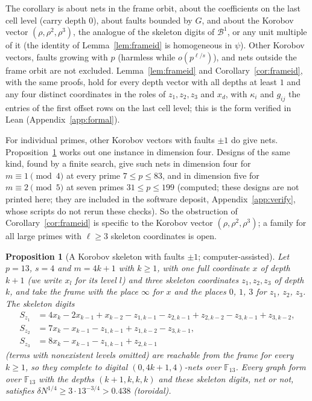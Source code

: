 \documentclass[11pt]{amsart}
\newtheorem{proposition}[theorem]{Proposition}
\theoremstyle{definition}
\theoremstyle{plain}
\newcommand{\F}{\mathbb{F}}
\begin{document}
The corollary is about nets in the frame orbit, about the coefficients on the last cell level (carry depth $0$), about faults bounded by $G$, and about the Korobov vector $(\rho,\rho^2,\rho^3)$, the analogue of the skeleton digits of $\mathcal B^1$, or any unit multiple of it (the identity of Lemma~\ref{lem:frameid} is homogeneous in $\psi$). Other Korobov vectors, faults growing with $p$ (harmless while $o(p^{\ell/s})$), and nets outside the frame orbit are not excluded. Lemma~\ref{lem:frameid} and Corollary~\ref{cor:frameid}, with the same proofs, hold for every depth vector with all depths at least $1$ and any four distinct coordinates in the roles of $z_1,z_2,z_3$ and $x_d$, with $\kappa_i$ and $g_{ij}$ the entries of the first offset rows on the last cell level; this is the form verified in Lean (Appendix~\ref{app:formal}).

For individual primes, other Korobov vectors with faults $\pm1$ do give nets. Proposition~\ref{prop:korobov4} works out one instance in dimension four. Designs of the same kind, found by a finite search, give such nets in dimension four for $m\equiv1\pmod4$ at every prime $7\le p\le83$, and in dimension five for $m\equiv2\pmod5$ at seven primes $31\le p\le199$ (computed; these designs are not printed here; they are included in the software deposit, Appendix~\ref{app:verify}, whose scripts do not rerun these checks). So the obstruction of Corollary~\ref{cor:frameid} is specific to the Korobov vector $(\rho,\rho^2,\rho^3)$; a family for all large primes with $\ell\ge3$ skeleton coordinates is open.

\begin{proposition}[A Korobov skeleton with faults $\pm1$; computer-assisted]\label{prop:korobov4}
Let $p=13$, $s=4$ and $m=4k+1$ with $k\ge1$, with one full coordinate $x$ of depth $k+1$ (we write $x_l$ for its level $l$) and three skeleton coordinates $z_1,z_2,z_3$ of depth $k$, and take the frame with the place $\infty$ for $x$ and the places $0$, $1$, $3$ for $z_1$, $z_2$, $z_3$. The skeleton digits
\begin{align*}
S_{z_1}&=4x_k-2x_{k-1}+x_{k-2}-z_{1,k-1}-z_{2,k-1}+z_{2,k-2}-z_{3,k-1}+z_{3,k-2},\\
S_{z_2}&=7x_k-x_{k-1}-z_{1,k-1}+z_{1,k-2}-z_{3,k-1},\\
S_{z_3}&=8x_k-x_{k-1}-z_{1,k-1}+z_{2,k-1}
\end{align*}
(terms with nonexistent levels omitted) are reachable from the frame for every $k\ge1$, so they complete to digital $(0,4k+1,4)$-nets over $\F_{13}$. Every graph form over $\F_{13}$ with the depths $(k+1,k,k,k)$ and these skeleton digits, net or not, satisfies $\delta N^{1/4}\ge3\cdot13^{-3/4}>0.438$ (toroidal).
\end{proposition}
\end{document}
